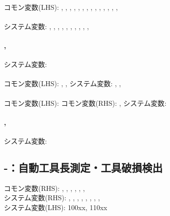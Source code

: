 \paragraph*{}
コモン変数(LHS):
, , , , , , , , , , , , , , 

\paragraph*{}
システム変数:
, , , , , , , , , , 

\paragraph*{, }
システム変数: 

\paragraph*{}
コモン変数(LHS): , ,  \quad
システム変数: , , 

\paragraph*{}
コモン変数(LHS):  \quad
コモン変数(RHS): ,  \quad
システム変数: 

\paragraph*{, }
システム変数: 

\subsection{-：自動工具長測定・工具破損検出}
\begin{hosoku}\small
コモン変数(RHS): , , , , , , \\
システム変数(RHS): , , , , , , , , \\
システム変数(LHS): \ttNum100xx, \ttNum110xx
\end{hosoku}

